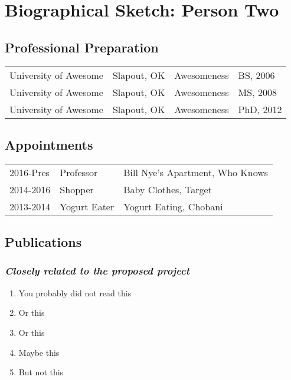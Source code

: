 
\setcounter{subsection}{0}
\renewcommand\thesubsection{(\alph{subsection})}
\renewcommand\thesubsubsection{\textit{(\roman{subsubsection})}}

\section*{Biographical Sketch: Person Two}

\subsection{Professional Preparation}
\begin{tabular}[c]{llll}
University of Awesome & Slapout, OK & Awesomeness & BS, 2006\\
University of Awesome & Slapout, OK & Awesomeness & MS, 2008\\
University of Awesome & Slapout, OK & Awesomeness & PhD, 2012\\
\end{tabular}

\subsection{Appointments}
\begin{tabularx}{\textwidth}{ l l Y }
2016-Pres & Professor & Bill Nye's Apartment, Who Knows \\
2014-2016 & Shopper & Baby Clothes, Target \\
2013-2014 & Yogurt Eater & Yogurt Eating, Chobani \\
\end{tabularx}

\subsection{Publications}
\subsubsection{\textit{Closely related to the proposed project}}
\begin{enumerate}
\item You probably did not read this
\item Or this
\item Or this
\item Maybe this
\item But not this
\end{enumerate}

